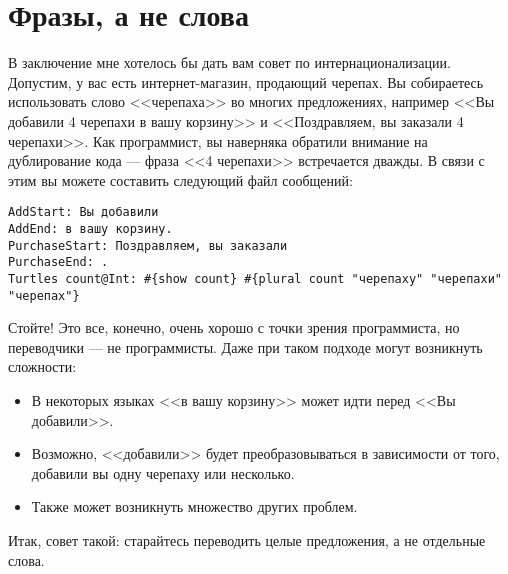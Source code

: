 \section{Фразы, а не слова} %

В заключение мне хотелось бы дать вам совет по интернационализации. Допустим, у вас есть интернет-магазин, продающий черепах. Вы собираетесь использовать слово <<черепаха>> во многих предложениях, например <<Вы добавили 4 черепахи в вашу корзину>> и <<Поздравляем, вы заказали 4 черепахи>>. Как программист, вы наверняка обратили внимание на дублирование кода --- фраза <<4 черепахи>> встречается дважды. В связи с этим вы можете составить следующий файл сообщений:

\begin{lstlisting}
AddStart: Вы добавили
AddEnd: в вашу корзину.
PurchaseStart: Поздравляем, вы заказали
PurchaseEnd: .
Turtles count@Int: #{show count} #{plural count "черепаху" "черепахи" "черепах"}
\end{lstlisting}

Стойте! Это все, конечно, очень хорошо с точки зрения программиста, но переводчики --- не программисты. Даже при таком подходе могут возникнуть сложности:

\begin{itemize}
  \item В некоторых языках <<в вашу корзину>> может идти перед <<Вы добавили>>.
  \item Возможно, <<добавили>> будет преобразовываться в зависимости от того, добавили вы одну черепаху или несколько.
  \item Также может возникнуть множество других проблем. %
\end{itemize}

Итак, совет такой: старайтесь переводить целые предложения, а не отдельные слова.
